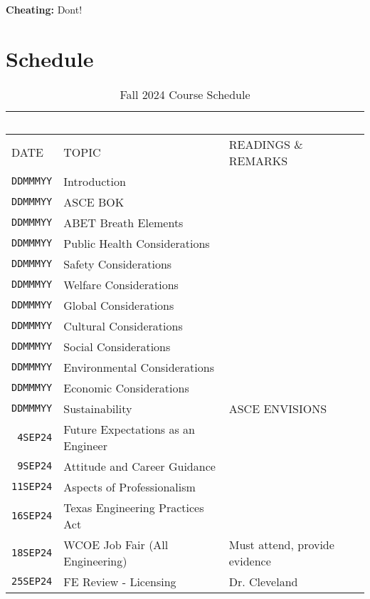 \documentclass[12pt]{article}
\begin{document}
\textbf{Cheating:} Dont!


\clearpage
\section*{Schedule}
\begin{table}[ht!]
   \centering
   \caption{Fall 2024 Course Schedule}
   \begin{tabular}{p{0.5in}p{2.5in}p{4.0in}} 
   ~ & ~ & ~  \\
\hline
DATE & TOPIC & READINGS \& REMARKS  \\
\hline
\texttt{DDMMMYY} & Introduction &   \\ %
\texttt{DDMMMYY} & ASCE BOK &  \cite{ASCE2019}\\ %
\texttt{DDMMMYY} & ABET Breath Elements & \cite{ASCE2019} \\%
\texttt{DDMMMYY} & Public Health Considerations &  \cite{ASCE2019} \\ %
\texttt{DDMMMYY} & Safety Considerations &  \cite{ASCE2019} \\ %
\texttt{DDMMMYY} & Welfare Considerations &  \cite{ASCE2019} \\ %
\texttt{DDMMMYY} & Global Considerations &  \cite{ASCE2019} \\ %
\texttt{DDMMMYY} & Cultural Considerations &  \cite{ASCE2019} \\ %
\texttt{DDMMMYY} & Social Considerations &  \cite{ASCE2019} \\ %
\texttt{DDMMMYY} & Environmental Considerations &  \cite{ASCE2019} \\ %
\texttt{DDMMMYY} & Economic Considerations &  \cite{ASCE2019} \\ %
\texttt{DDMMMYY} & Sustainability & ASCE ENVISIONS \cite{ASCE2019} \\ %
\texttt{~4SEP24} & Future Expectations as an Engineer & \\ %
\texttt{~9SEP24} & Attitude and Career Guidance &  \cite{Attitude2024} \\ %
\texttt{11SEP24} & Aspects of Professionalism   &  \cite{Lawson2004}\\ %
\texttt{16SEP24} & Texas Engineering Practices Act & \cite{TEPA2021}\\ %
\texttt{18SEP24} & WCOE Job Fair (All Engineering)   & Must attend, provide evidence\\ %
\texttt{25SEP24} & FE Review - Licensing & Dr. Cleveland \cite{TEPA2021} \\  %

\end{tabular}
\end{table}
\end{document}
